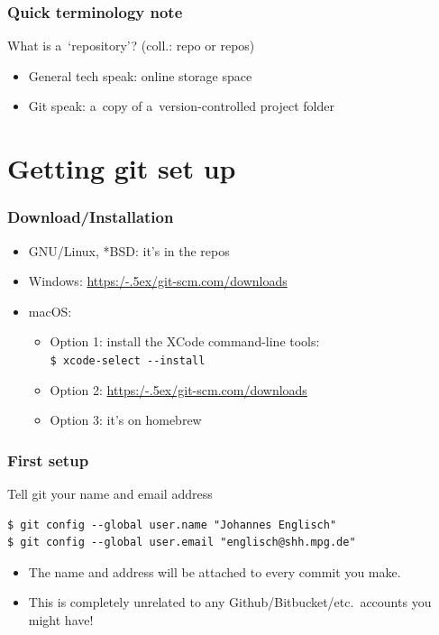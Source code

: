 \documentclass[12pt]{beamer}
\begin{document}
\begin{frame}
  \frametitle{Quick terminology note}

  \begin{block}{What is a~`repository'?}
    {\footnotesize{}(coll.: \alert{repo} or \alert{repos})}
    \begin{itemize}
      \item General tech speak:
        online storage space
      \item Git speak:
        a~copy of a~version-controlled project folder
    \end{itemize}
  \end{block}
\end{frame}


\section{Getting git set up}

\begin{frame}[fragile]
  \frametitle{Download/Installation}

  \begin{itemize}
    \item GNU/Linux, *BSD: it's in the repos
    \item Windows: \href{https://git-scm.com/downloads}{https:/\kern-.5ex/git-scm.com/downloads}
    \item macOS:
      \begin{itemize}
        \item Option 1: install the XCode command-line tools:\\
          \verb"$ xcode-select --install"
        \item Option 2: \href{https://git-scm.com/downloads}{https:/\kern-.5ex/git-scm.com/downloads}
        \item Option 3: it's on homebrew
      \end{itemize}
  \end{itemize}
\end{frame}

\begin{frame}[fragile]
  \frametitle{First setup}

  \begin{block}{Tell git your name and email address}
    {\footnotesize{}%
      \begin{verbatim}
$ git config --global user.name "Johannes Englisch"
$ git config --global user.email "englisch@shh.mpg.de"
      \end{verbatim}%
    }
    \begin{itemize}
      \item The name and address will be attached to \alert{every commit} you
        make.
      \item This is completely unrelated to any
        Github/\hspace{0}Bitbucket/\hspace{0}etc.\ accounts you might have!
    \end{itemize}
  \end{block}
\end{frame}
\end{document}
